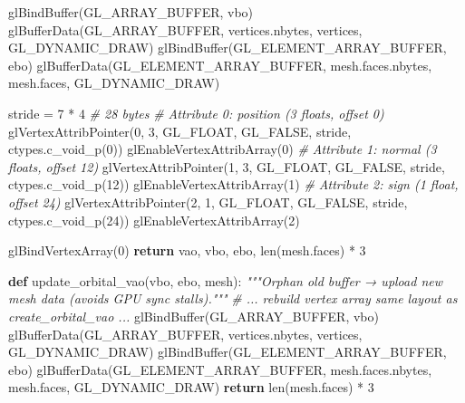 \documentclass[
  11pt,
]{report}
\newenvironment{Shaded}{}{}
\newcommand{\BuiltInTok}[1]{\textcolor[rgb]{0.00,0.50,0.00}{#1}}
\newcommand{\CommentTok}[1]{\textcolor[rgb]{0.38,0.63,0.69}{\textit{#1}}}
\newcommand{\ControlFlowTok}[1]{\textcolor[rgb]{0.00,0.44,0.13}{\textbf{#1}}}
\newcommand{\DecValTok}[1]{\textcolor[rgb]{0.25,0.63,0.44}{#1}}
\newcommand{\KeywordTok}[1]{\textcolor[rgb]{0.00,0.44,0.13}{\textbf{#1}}}
\newcommand{\NormalTok}[1]{#1}
\newcommand{\OperatorTok}[1]{\textcolor[rgb]{0.40,0.40,0.40}{#1}}
\begin{document}
\begin{Shaded}
\begin{Highlighting}[]
\NormalTok{    glBindBuffer(GL\_ARRAY\_BUFFER, vbo)}
\NormalTok{    glBufferData(GL\_ARRAY\_BUFFER, vertices.nbytes, vertices, GL\_DYNAMIC\_DRAW)}
\NormalTok{    glBindBuffer(GL\_ELEMENT\_ARRAY\_BUFFER, ebo)}
\NormalTok{    glBufferData(GL\_ELEMENT\_ARRAY\_BUFFER, mesh.faces.nbytes, mesh.faces, GL\_DYNAMIC\_DRAW)}

\NormalTok{    stride }\OperatorTok{=} \DecValTok{7} \OperatorTok{*} \DecValTok{4}                           \CommentTok{\# 28 bytes}
    \CommentTok{\# Attribute 0: position (3 floats, offset 0)}
\NormalTok{    glVertexAttribPointer(}\DecValTok{0}\NormalTok{, }\DecValTok{3}\NormalTok{, GL\_FLOAT, GL\_FALSE, stride, ctypes.c\_void\_p(}\DecValTok{0}\NormalTok{))}
\NormalTok{    glEnableVertexAttribArray(}\DecValTok{0}\NormalTok{)}
    \CommentTok{\# Attribute 1: normal (3 floats, offset 12)}
\NormalTok{    glVertexAttribPointer(}\DecValTok{1}\NormalTok{, }\DecValTok{3}\NormalTok{, GL\_FLOAT, GL\_FALSE, stride, ctypes.c\_void\_p(}\DecValTok{12}\NormalTok{))}
\NormalTok{    glEnableVertexAttribArray(}\DecValTok{1}\NormalTok{)}
    \CommentTok{\# Attribute 2: sign (1 float, offset 24)}
\NormalTok{    glVertexAttribPointer(}\DecValTok{2}\NormalTok{, }\DecValTok{1}\NormalTok{, GL\_FLOAT, GL\_FALSE, stride, ctypes.c\_void\_p(}\DecValTok{24}\NormalTok{))}
\NormalTok{    glEnableVertexAttribArray(}\DecValTok{2}\NormalTok{)}

\NormalTok{    glBindVertexArray(}\DecValTok{0}\NormalTok{)}
    \ControlFlowTok{return}\NormalTok{ vao, vbo, ebo, }\BuiltInTok{len}\NormalTok{(mesh.faces) }\OperatorTok{*} \DecValTok{3}


\KeywordTok{def}\NormalTok{ update\_orbital\_vao(vbo, ebo, mesh):}
    \CommentTok{"""Orphan old buffer → upload new mesh data (avoids GPU sync stalls)."""}
    \CommentTok{\# ... rebuild vertex array same layout as create\_orbital\_vao ...}
\NormalTok{    glBindBuffer(GL\_ARRAY\_BUFFER, vbo)}
\NormalTok{    glBufferData(GL\_ARRAY\_BUFFER, vertices.nbytes, vertices, GL\_DYNAMIC\_DRAW)}
\NormalTok{    glBindBuffer(GL\_ELEMENT\_ARRAY\_BUFFER, ebo)}
\NormalTok{    glBufferData(GL\_ELEMENT\_ARRAY\_BUFFER, mesh.faces.nbytes, mesh.faces, GL\_DYNAMIC\_DRAW)}
    \ControlFlowTok{return} \BuiltInTok{len}\NormalTok{(mesh.faces) }\OperatorTok{*} \DecValTok{3}



\end{Highlighting}
\end{Shaded}
\end{document}

